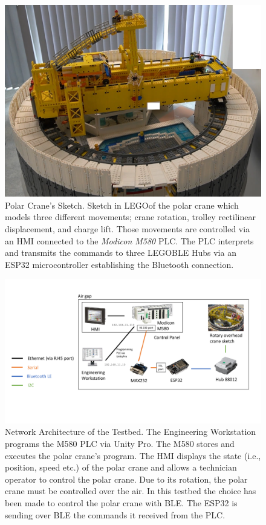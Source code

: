 \begin{figure}[H]
    \centering
    \vspace{-1.3cm}
    \includegraphics[width=\linewidth]{figures/polar-crane}
    \caption{Polar Crane's Sketch. Sketch in LEGO\texttrademark of the polar crane which models three different movements; crane rotation, trolley rectilinear displacement, and charge lift. Those movements are controlled via an HMI connected to the \emph{Modicon M580} PLC. The PLC interprets and transmits the commands to three LEGO\texttrademark BLE Hubs via an ESP32 microcontroller establishing the Bluetooth connection.}
    \label{fig:polar-crane}
\end{figure}

\begin{figure}
    \centering
    \includegraphics[width=\linewidth]{figures/Setup.pdf}
    \caption{Network Architecture of the Testbed. The Engineering Workstation programs the M580 PLC via Unity Pro. The M580 stores and executes the polar crane's program. The HMI displays the state (i.e., position, speed etc.) of the polar crane and allows a technician operator to control the polar crane. Due to its rotation, the polar crane must be controlled over the air. In this testbed the choice has been made to control the polar crane with BLE. The ESP32 is sending over BLE the commands it received from the PLC.}
    \label{fig:setup}
\end{figure}

